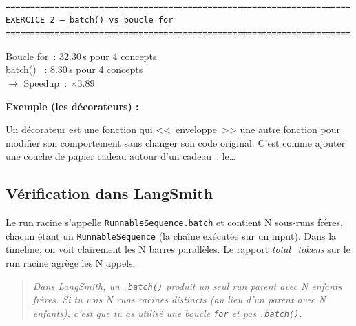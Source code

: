 \documentclass[11pt,a4paper]{article}
\begin{document}
\begin{tcolorbox}[
  colback=white,
  colframe=black!50,
  coltitle=black,
  fonttitle=\footnotesize\bfseries,
  fontupper=\footnotesize,
  title=Sortie de l'exécution,
  breakable,
]
\begin{verbatim}
======================================================================
EXERCICE 2 — batch() vs boucle for
======================================================================
\end{verbatim}

Boucle for~: 32.30\,s pour 4 concepts\\
batch()   ~: 8.30\,s pour 4 concepts\\
$\rightarrow$ Speedup~: $\times 3.89$

\textbf{Exemple (les décorateurs) :}

Un décorateur est une fonction qui <<~enveloppe~>> une autre fonction pour
modifier son comportement sans changer son code original. C'est comme
ajouter une couche de papier cadeau autour d'un cadeau~: le\dots
\end{tcolorbox}

\subsection{Vérification dans LangSmith}

Le run racine s'appelle \texttt{RunnableSequence.batch} et contient N
sous-runs frères, chacun étant un \texttt{RunnableSequence} (la chaîne
exécutée sur un input). Dans la timeline, on voit clairement les N barres
parallèles. Le rapport \emph{total\_tokens} sur le run racine agrège les
N appels.

\begin{quote}\itshape
Dans LangSmith, un \texttt{.batch()} produit un seul run parent avec N
enfants frères. Si tu vois N runs racines distincts (au lieu d'un parent
avec N enfants), c'est que tu as utilisé une boucle \texttt{for} et pas
\texttt{.batch()}.
\end{quote}
\end{document}
